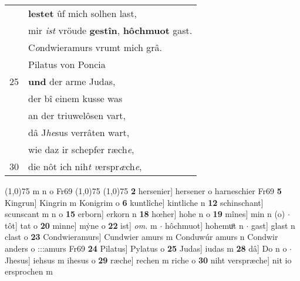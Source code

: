 \documentclass[8pt,a4paper,notitlepage]{article}
\begin{document}
\begin{table}[ht]
\begin{minipage}[t]{0.5\linewidth}
\begin{tabular}{rl}
 & \textbf{lestet} ûf mich solhen last,\\ 
 & mir \textit{ist} vröude \textbf{gestîn}, \textbf{hôchmuot} gast.\\ 
 & C\textit{o}ndwieramurs vrumt mich grâ.\\ 
 & Pilatus von Poncia\\ 
25 & \textbf{und} der arme Judas,\\ 
 & der bî einem kusse was\\ 
 & an der triuwelôsen vart,\\ 
 & dâ J\textit{he}sus verrâten wart,\\ 
 & wie daz ir schepfer ræch\textit{e},\\ 
30 & die nôt ich nih\textit{t} \textit{v}erspr\textit{æ}ch\textit{e},\\ 
\end{tabular}
\scriptsize
\line(1,0){75} \newline
m n o Fr69 \newline
\line(1,0){75} \newline
\newline
\line(1,0){75} \newline
\textbf{2} hersenier] hersener o harneschier Fr69 \textbf{5} Kingrun] Kingrin m Konigrim o \textbf{6} kuntlîche] kintliche n \textbf{12} schinschant] scunscant m n o \textbf{15} erborn] erkorn n \textbf{18} hœher] hohe n o \textbf{19} mînes] min n (o)  $\cdot$ tôt] tat o \textbf{20} minne] mẏne o \textbf{22} ist] \textit{om.} m  $\cdot$ hôchmuot] hohemuͦt n  $\cdot$ gast] glast n clast o \textbf{23} Condwieramurs] Cundwier amurs m Conduwúr amurs n Condwir anders o :::amurs Fr69 \textbf{24} Pilatus] Pylatus o \textbf{25} Judas] iudas m \textbf{28} dâ] Do n o  $\cdot$ Jhesus] iehsus m ihesus o \textbf{29} ræche] rechen m riche o \textbf{30} niht verspræche] nit io ersprochen m \newline
\end{minipage}
\end{table}
\newpage
\end{document}
